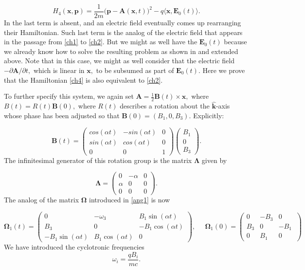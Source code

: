 \documentclass[12pt]{article}
\numberwithin{equation}{section}
\newcommand{\bOm}{{\boldsymbol \Omega}}
\newcommand{\bLambda}{{\boldsymbol \Lambda}}
\def\bA{{\boldsymbol A}}
\def\bB{{\boldsymbol B}}
\def\bk{{\boldsymbol k}}
\def\bp{{\boldsymbol p}}
\def\bE{{\boldsymbol E}}
\def\bx{{\boldsymbol x}}
\begin{document}
\begin{equation}\label{ch4}
H_4(\bx,\bp) = \frac{1}{2m}\bigg(\bp-\bA(\bx,t)\bigg)^2 -q\langle\bx,\bE_0(t)\rangle.
\end{equation}
In \cite{dJ} the last term is absent, and an electric field eventually comes up rearranging their Hamiltonian. Such last term is the analog of the electric field that appears in the passage from \eqref{ch1} to \eqref{ch2}. But we might as well have the $\bE_0(t)$ because we already know how to solve the resulting problem as shown in \cite{Gz2} and extended above. Note that in this case, we might as well consider that the electric field $-\partial \bA/\partial t,$ which is linear in $\bx,$ to be subsumed as part of $\bE_0(t).$ Here we prove that the Hamiltonian \eqref{ch4} is also equivalent to \eqref{ch2}.

To further specify this system, we again set $\bA=\frac{1}{2}\bB(t)\times\bx,$ where $B(t)=R(t)\bB(0),$ where $R(t)$ describes a rotation about the $\hat{\bk}$-axis whose phase has been adjusted so that $\bB(0)=(B_1,0,B_3).$  Explicitly:

\begin{equation}\label{rot3}
\bB(t) = \begin{pmatrix}
		cos(\alpha t) & -sin(\alpha t) & 0\\
		sin(\alpha t)  & cos(\alpha t) & 0\\
		0  & 0  & 1\end{pmatrix} \begin{pmatrix} B_1\\ 0\\B_3\end{pmatrix}.
\end{equation}
The infinitesimal generator of this rotation group is the matrix $\bLambda$ given by

\begin{equation}\label{infgen2}
\bLambda = \begin{pmatrix}
		0 & -\alpha &  0 \\
		\alpha & 0 &   0\\
		0 & 0  & 0\end{pmatrix} .
\end{equation}
The analog of the matrix $\bOm$ introduced in \eqref{ang1} is now

\begin{equation}\label{ang4}
\bOm_1(t) = \begin{pmatrix}
		0 & -\omega_3 &  B_1\sin(\alpha t) \\
		B_3 & 0 &   -B_1\cos(\alpha t) \\
		-B_1\sin(\alpha t)  & B_1\cos(\alpha t)  & 0\end{pmatrix} ,\;\;\;\;\;
\bOm_1(0) = \begin{pmatrix}		
                 0 &  -B_3  &  0 \\
		B_3 & 0 &   -B_1\ \\
		0 & B_1  & 0\end{pmatrix} 
\end{equation}
We have introduced the cyclotronic frequencies 
\begin{equation}\label{cyc}
\omega_i = \frac{qB_i}{mc}.
\end{equation}
\end{document}
